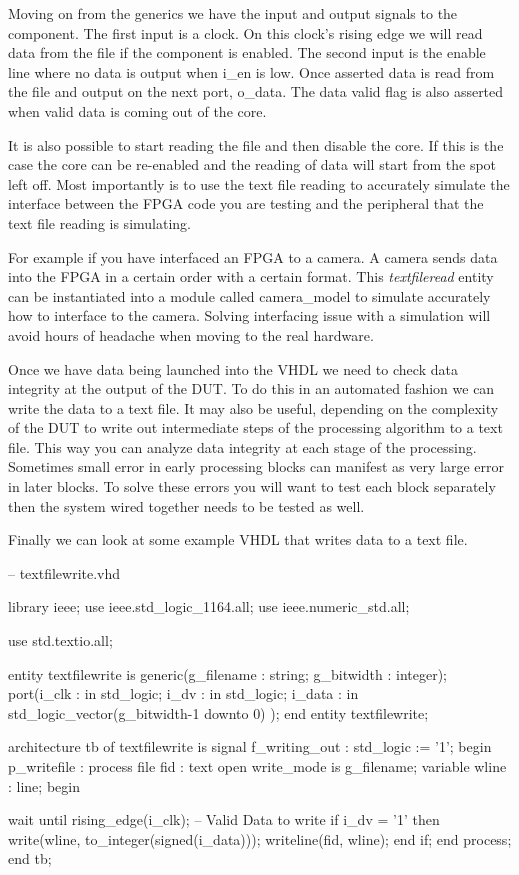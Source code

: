 Moving on from the generics we have the input and output signals to the component. The first input is a clock. On this clock's rising edge we will read data from the file if the component is enabled. The second input is the enable line where no data is output when i\_en is low. Once asserted data is read from the file and output on the next port, o\_data. The data valid flag is also asserted when valid data is coming out of the core. 

It is also possible to start reading the file and then disable the core. If this is the case the core can be re-enabled and the reading of data will start from the spot left off. Most importantly is to use the text file reading to accurately simulate the interface between the \ac{FPGA} code you are testing and the peripheral that the text file reading is simulating.

For example if you have interfaced an \ac{FPGA} to a camera. A camera sends data into the \ac{FPGA} in a certain order with a certain format. This \emph{textfileread} entity can be instantiated into a module called camera\_model to simulate accurately how to interface to the camera. Solving interfacing issue with a simulation will avoid hours of headache when moving to the real hardware. 

Once we have data being launched into the \ac{VHDL} we need to check data integrity at the output of the \ac{DUT}. To do this in an automated fashion we can write the data to a text file. It may also be useful, depending on the complexity of the \ac{DUT} to write out intermediate steps of the processing algorithm to a text file. This way you can analyze data integrity at each stage of the processing. Sometimes small error in early processing blocks can manifest as very large error in later blocks. To solve these errors you will want to test each block separately then the system wired together needs to be tested as well. 

Finally we can look at some example \ac{VHDL} that writes data to a text file. 

\begin{VHDLlisting}[tabsize=4]
-- textfilewrite.vhd

library	ieee;
	use ieee.std_logic_1164.all;
	use ieee.numeric_std.all;
	
	use std.textio.all;
	
entity textfilewrite is 
	generic(g_filename : string;
	        g_bitwidth : integer);
	port(i_clk      : in    std_logic;
		 i_dv       : in    std_logic;
		 i_data     : in    std_logic_vector(g_bitwidth-1 downto 0)
	);
end entity textfilewrite;

architecture tb of textfilewrite is
	signal f_writing_out : std_logic := '1';
begin
	p_writefile : process
		file fid  : text open write_mode is g_filename;
		variable wline : line;
	begin
		
		wait until rising_edge(i_clk);
		-- Valid Data to write
		if i_dv = '1' then
			write(wline, to_integer(signed(i_data)));
			writeline(fid, wline);
		end if;
	end process;
end tb;
\end{VHDLlisting}

